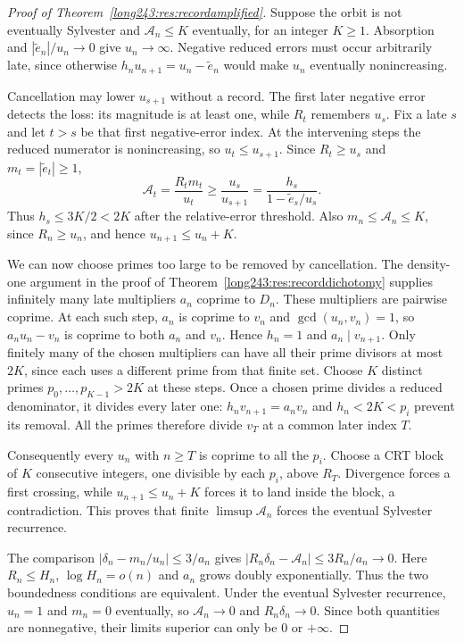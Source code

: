 \begin{proof}[Proof of Theorem~\ref{long243:res:recordamplified}]
Suppose the orbit is not eventually Sylvester and
$\mathcal A_n\le K$ eventually, for an integer $K\ge1$.
Absorption and $|\tilde e_n|/u_n\to0$ give $u_n\to\infty$.
Negative reduced errors must occur arbitrarily late, since otherwise
$h_nu_{n+1}=u_n-\tilde e_n$ would make $u_n$ eventually nonincreasing.

Cancellation may lower $u_{s+1}$ without a record. The first later
negative error detects the loss: its magnitude is at least one, while
$R_t$ remembers $u_s$. Fix a late $s$ and let $t>s$ be that first
negative-error index.
At the intervening steps the reduced numerator is nonincreasing, so
$u_t\le u_{s+1}$. Since $R_t\ge u_s$ and
$m_t=|\tilde e_t|\ge1$,
\[
 \mathcal A_t=\frac{R_tm_t}{u_t}\ge\frac{u_s}{u_{s+1}}
 =\frac{h_s}{1-\tilde e_s/u_s}.
\]
Thus $h_s\le3K/2<2K$ after the relative-error threshold.
Also $m_n\le\mathcal A_n\le K$, since $R_n\ge u_n$, and hence
$u_{n+1}\le u_n+K$.

We can now choose primes too large to be removed by cancellation.
The density-one argument in the proof of
Theorem~\ref{long243:res:recorddichotomy} supplies infinitely many
late multipliers $a_n$ coprime to $D_n$. These multipliers are pairwise
coprime. At each such step, $a_n$ is coprime to $v_n$ and
$\gcd(u_n,v_n)=1$, so $a_nu_n-v_n$ is coprime to both $a_n$ and $v_n$.
Hence $h_n=1$ and $a_n\mid v_{n+1}$.
Only finitely many of the chosen multipliers can have all their prime
divisors at most $2K$, since each uses a different prime from that finite
set. Choose $K$ distinct primes $p_0,\ldots,p_{K-1}>2K$ at these
steps. Once a chosen prime divides a reduced denominator, it divides
every later one: $h_nv_{n+1}=a_nv_n$ and $h_n<2K<p_i$ prevent its
removal. All the primes therefore divide $v_T$ at a common later index $T$.

Consequently every $u_n$ with $n\ge T$
is coprime to all the $p_i$. Choose a CRT block of $K$ consecutive
integers, one divisible by each $p_i$, above $R_T$.
Divergence forces a first crossing, while
$u_{n+1}\le u_n+K$ forces it to land inside the block, a contradiction.
This proves that finite $\limsup\mathcal A_n$ forces the eventual Sylvester recurrence.

The comparison
$|\delta_n-m_n/u_n|\le3/a_n$ gives
$|R_n\delta_n-\mathcal A_n|\le3R_n/a_n\to0$.
Here $R_n\le H_n$, $\log H_n=o(n)$ and $a_n$ grows doubly
exponentially. Thus the two boundedness conditions are equivalent.
Under the eventual Sylvester recurrence, $u_n=1$ and $m_n=0$ eventually, so
$\mathcal A_n\to0$ and $R_n\delta_n\to0$. Since both quantities are
nonnegative, their limits superior can only be $0$ or $+\infty$.
\end{proof}

